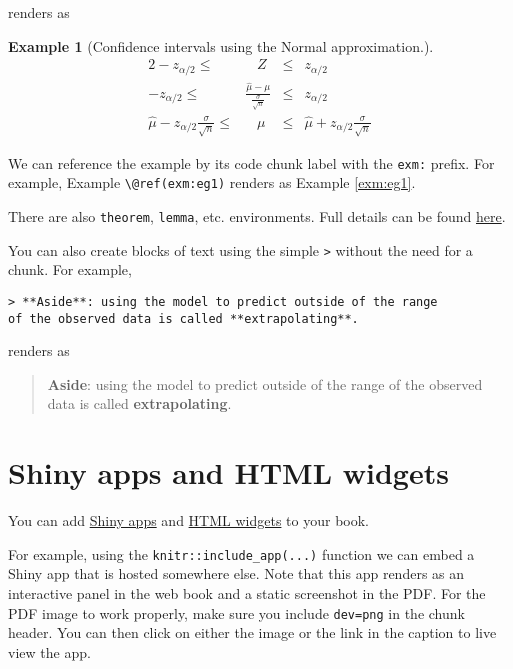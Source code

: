 \documentclass[
  oneside]{krantz}
\theoremstyle{definition}
\theoremstyle{definition}
\newtheorem{example}{Example}[chapter]
\theoremstyle{definition}
\theoremstyle{remark}
\begin{document}
renders as

\begin{example}[Confidence intervals using the Normal approximation.]
\protect\hypertarget{exm:eg1}{}{\label{exm:eg1} \iffalse (Confidence intervals using the Normal approximation.) \fi{} }\begin{alignat*}{2}
-z_{\alpha/2} \leq{} & \;\;\;Z & \leq{} & z_{\alpha/2} \\
-z_{\alpha/2} \leq{} & \frac{\hat{\mu}-\mu}{\frac{\sigma}{\sqrt{n}}} & \leq{} & z_{\alpha/2}\\
\hat{\mu} - z_{\alpha/2}\frac{\sigma}{\sqrt{n}} \leq{} & \;\;\;\mu & \leq{} & \hat{\mu} + z_{\alpha/2}\frac{\sigma}{\sqrt{n}}
\end{alignat*}
\end{example}

We can reference the example by its code chunk label with the \texttt{exm:} prefix. For example, Example \texttt{\textbackslash{}@ref(exm:eg1)} renders as Example \ref{exm:eg1}.

There are also \texttt{theorem}, \texttt{lemma}, etc. environments. Full details can be found \href{https://bookdown.org/yihui/bookdown/markdown-extensions-by-bookdown.html}{here}.

You can also create blocks of text using the simple \texttt{\textgreater{}} without the need for a chunk. For example,

\begin{verbatim}
> **Aside**: using the model to predict outside of the range 
of the observed data is called **extrapolating**.
\end{verbatim}

renders as

\begin{quote}
\textbf{Aside}: using the model to predict outside of the range of the observed data is called \textbf{extrapolating}.
\end{quote}

\hypertarget{shiny-apps-and-html-widgets}{%
\section{Shiny apps and HTML widgets}\label{shiny-apps-and-html-widgets}}

You can add \href{https://bookdown.org/yihui/bookdown/web-pages-and-shiny-apps.html}{Shiny apps} and \href{https://bookdown.org/yihui/bookdown/html-widgets.html}{HTML widgets} to your book.

For example, using the \texttt{knitr::include\_app(...)} function we can embed a Shiny app that is hosted somewhere else.
Note that this app renders as an interactive panel in the web book and a static screenshot in the PDF. For the PDF image to work properly, make sure you include \texttt{dev=\textquotesingle{}png\textquotesingle{}} in the chunk header. You can then click on either the image or the link in the caption to live view the app.
\end{document}
